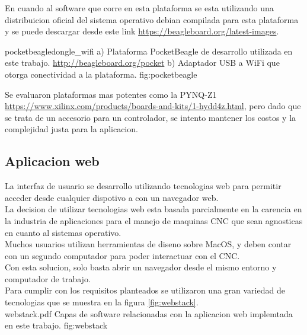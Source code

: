    En cuando al software que corre en esta plataforma se esta utilizando una distribuicion oficial del sistema operativo debian compilada para esta plataforma y se puede descargar desde este link \url{https://beagleboard.org/latest-images}.


         {pocketbeagle}{dongle_wifi}
         {a) Plataforma PocketBeagle de desarrollo utilizada en este trabajo. \url{http://beagleboard.org/pocket} b) Adaptador USB a WiFi que otorga conectividad a la plataforma. }
         {fig:pocketbeagle}

         Se evaluaron plataformas mas potentes como la PYNQ-Z1 \url{https://www.xilinx.com/products/boards-and-kits/1-hydd4z.html}, pero dado que se trata de un accesorio para un controlador, se intento mantener los costos y la complejidad justa para la aplicacion.\\
   

\subsection{Aplicacion web}
   La interfaz de usuario se desarrollo utilizando tecnologias web para permitir acceder desde cualquier dispotivo a con un navegador web. \\
   La decision de utilizar tecnologias web esta basada parcialmente en la carencia en la industria de aplicaciones para el manejo de maquinas CNC que sean agnosticas en cuanto al sistemas operativo. \\
Muchos usuarios utilizan herramientas de diseno sobre MacOS, y deben contar con un segundo computador para poder interactuar con el CNC. \\
   Con esta solucion, solo basta abrir un navegador desde el mismo entorno y computador de trabajo.\\
   Para cumplir con los requisitos planteados se utilizaron una gran variedad de tecnologias que se muestra en la figura \ref{fig:webstack}.\\
            {webstack.pdf}
            {Capas de software relacionadas con la aplicacion web implemtada en este trabajo.}
            {fig:webstack}


